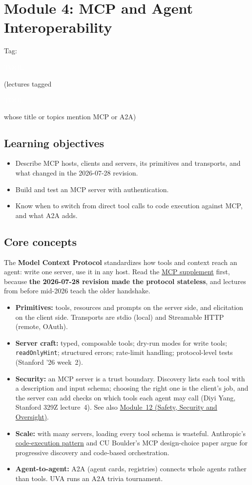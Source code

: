 \documentclass[10pt,oneside]{report}
\newcommand{\tg}[1]{{\setlength{\fboxsep}{1.2pt}\colorbox{tag#1}{\kern1pt\textcolor{white}{\sffamily\bfseries\fontsize{5.5}{6}\selectfont\strut #1}\kern1.5pt}}}
\begin{document}
\chapter{Module 4: MCP and Agent Interoperability}\hypertarget{mod-MCP}{}
{\small Tag: \tg{TOOL} (lectures tagged \tg{TOOL} whose title or topics mention MCP or A2A)}
\section{Learning objectives}
\begin{itemize}
\item Describe MCP hosts, clients and servers, its primitives and transports, and what changed in the 2026-07-28 revision.
\item Build and test an MCP server with authentication.
\item Know when to switch from direct tool calls to code execution against MCP, and what A2A adds.
\end{itemize}
\section{Core concepts}
The \textbf{Model Context Protocol} standardizes how tools and context reach an agent: write one server, use it in any host. Read the \hyperref[sup-mcp]{MCP supplement} first, because \textbf{the 2026-07-28 revision made the protocol stateless}, and lectures from before mid-2026 teach the older handshake.
\begin{itemize}
\item \textbf{Primitives:} tools, resources and prompts on the server side, and elicitation on the client side. Transports are stdio (local) and Streamable HTTP (remote, OAuth).
\item \textbf{Server craft:} typed, composable tools; dry-run modes for write tools; \texttt{readOnlyHint}; structured errors; rate-limit handling; protocol-level tests (Stanford '26 week~2).
\item \textbf{Security:} an MCP server is a trust boundary. Discovery lists each tool with a description and input schema; choosing the right one is the client's job, and the server can add checks on which tools each agent may call (Diyi Yang, Stanford 329Z lecture~4). See also \hyperlink{mod-SAFE}{Module~12 (Safety, Security and Oversight)}.
\item \textbf{Scale:} with many servers, loading every tool schema is wasteful. Anthropic's \hyperref[sup-codeexec]{code-execution pattern} and CU Boulder's MCP design-choice paper argue for progressive discovery and code-based orchestration.
\item \textbf{Agent-to-agent:} A2A (agent cards, registries) connects whole agents rather than tools. UVA runs an A2A trivia tournament.
\end{itemize}
\end{document}
